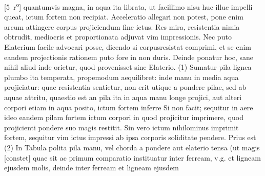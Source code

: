 [5~r\textsuperscript{o}] quantumvis magna, in aqua ita librata, ut facillimo nisu huc illuc impelli queat, ictum\protect{} fortem non recipiat. Acceleratio\protect{} allegari non potest, pone enim arcum attingere corpus projiciendum fine ictus\protect{}. Res mira, resistentia\protect{} nimia obtrudit, mediocris et proportionata adjuvat vim\protect{} impressionis. Nec puto Elaterium facile advocari posse, dicendo si corpusresistat comprimi, et se  enim eandem projectionis rationem puto fore in non duris. Deinde ponatur hoc, sane nihil aliud inde orietur,  quod provenisset sine Elaterio.
\pend
\count{}
\count{}
\pstart
(1) Sumatur pila\protect{} lignea plumbo\protect{} ita temperata,  propemodum aequilibret: inde manu in media aqua projiciatur: quae resistentia\protect{} sentietur, non erit utique a pondere pilae\protect{}, sed ab aquae attritu, quaestio est an pila\protect{} ita in aqua manu longe projici, aut alteri corpori etiam in aqua posito, ictum\protect{} fortem inferre  Si non facit; sequitur in aere ideo eandem pilam\protect{} fortem ictum\protect{} corpori in quod projicitur imprimere, quod projicienti pondere suo magis restitit. Sin vero ictum\protect{} nihilominus imprimit fortem, sequitur vim\protect{} ictus\protect{} impressi ab ipsa corporis soliditate pendere. Prius est 
\pend
\pstart
(2) In Tabula polita  pila\protect{} manu, vel chorda a pondere aut elaterio tensa (ut magis [constet] quae sit  ac primum comparatio instituatur inter ferream, v.g. et ligneam ejusdem molis, deinde inter ferream et ligneam ejusdem %
